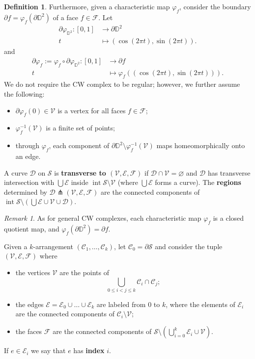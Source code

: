 \documentclass[11pt,reqno]{amsart}
\theoremstyle{plain}
\theoremstyle{definition}
\newtheorem{definition}[subsection]{Definition}
\theoremstyle{remark}
\newtheorem{remark}[subsection]{Remark}
\numberwithin{equation}{subsection}
\newcommand*{\bbD}{\mathbb{D}}
\newcommand*{\calC}{\mathcal{C}}
\newcommand*{\calD}{\mathcal{D}}
\newcommand*{\calE}{\mathcal{E}}
\newcommand*{\calF}{\mathcal{F}}
\newcommand*{\calS}{\mathcal{S}}
\newcommand*{\calV}{\mathcal{V}}
\DeclareMathOperator{\interior}{int}
\begin{document}
\begin{definition}
    Furthermore, given a characteristic map $\varphi_f$, consider the boundary $\partial f=\varphi_f(\partial \bbD^2)$ of a face $f\in\calF$. Let
    \begin{align*}
        \partial\varphi_{\bbD^2}\colon[0,1]&\to\partial\bbD^2\\
        t&\mapsto(\cos(2\pi t),\sin(2\pi t)).
    \end{align*}
    and
    \begin{align*}
        \partial\varphi_f:=\varphi_f\circ\partial\varphi_{\bbD^2}\colon[0,1]&\to\partial f\\
        t&\mapsto\varphi_f((\cos(2\pi t),\sin(2\pi t))).
    \end{align*}
    We do not require the CW complex to be regular; however, we further assume the following:
    \begin{itemize}
        \item $\partial\varphi_f(0)\in\calV$ is a vertex for all faces $f\in\calF$;
        \item $\varphi_f^{-1}(\calV)$ is a finite set of points;
        \item through $\varphi_f$, each component of $\partial\bbD^2\setminus\varphi_f^{-1}(\calV)$ maps homeomorphically onto an edge.
    \end{itemize}

    A curve $\calD$ on $\calS$ is \textbf{transverse to $(\calV,\calE,\calF)$} if $\calD\cap\calV=\varnothing$ and $\calD$ has transverse intersection with $\bigcup\calE$ inside $\interior\calS\setminus\calV$ (where $\bigcup\calE$ forms a curve). The \textbf{regions} determined by $\calD\pitchfork(\calV,\calE,\calF)$ are the connected components of $\interior\calS\setminus(\bigcup\calE\cup\calV\cup\calD)$.
\end{definition}

\begin{remark}
    As for general CW complexes, each characteristic map $\varphi_f$ is a closed quotient map, and $\varphi_f(\partial\bbD^2)=\partial f$.
\end{remark}

Given a $k$-arrangement $(\calC_1,\dots,\calC_k)$, let $\calC_0=\partial\calS$ and consider the tuple $(\calV,\calE,\calF)$ where
\begin{itemize}
    \item the vertices $\calV$ are the points of
    \[\bigcup_{0\le i<j\le k}\calC_i\cap\calC_j;\]
    \item the edges $\calE=\calE_0\cup\dots\cup\calE_k$ are labeled from 0 to $k$, where the elements of $\calE_i$ are the connected components of $\calC_i\setminus\calV$;
    \item the faces $\calF$ are the connected components of $\calS\setminus (\bigcup_{i=0}^k\calE_i\cup\calV)$.
\end{itemize}
If $e\in\calE_i$ we say that $e$ has \textbf{index} $i$.
\end{document}
